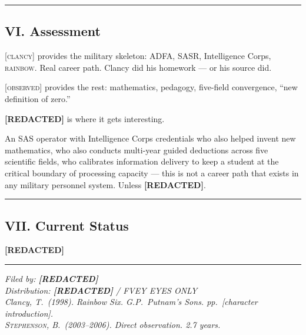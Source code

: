 \vspace{1cm}\hrule\vspace{1cm}

\subsection*{VI. Assessment}
\label{record:hd-assessment}

\textsc{[clancy]} provides the military skeleton: ADFA, SASR, Intelligence Corps, \textsc{rainbow}. Real career path. Clancy did his homework --- or his source did.

\textsc{[observed]} provides the rest: mathematics, pedagogy, five-field convergence, ``new definition of zero.''

\textbf{[REDACTED]} is where it gets interesting.

An SAS operator with Intelligence Corps credentials who also helped invent new mathematics, who also conducts multi-year guided deductions across five scientific fields, who calibrates information delivery to keep a student at the critical boundary of processing capacity --- this is not a career path that exists in any military personnel system. Unless \textbf{[REDACTED]}.

\vspace{1cm}\hrule\vspace{1cm}

\subsection*{VII. Current Status}
\label{record:hd-current-status}

\textbf{[REDACTED]}

\vspace{1cm}\hrule\vspace{0.5cm}

\begin{flushright}\small\textit{%
Filed by: \textbf{[REDACTED]}\\
Distribution: \textbf{[REDACTED]} / FVEY EYES ONLY\\[0.5em]
Clancy, T.\ (1998). Rainbow Six. G.P.\ Putnam's Sons. pp.\ [character introduction].\\
\textsc{Stephenson}, B.\ (2003--2006). Direct observation. 2.7 years.%
}\end{flushright}

\chapterreturn
